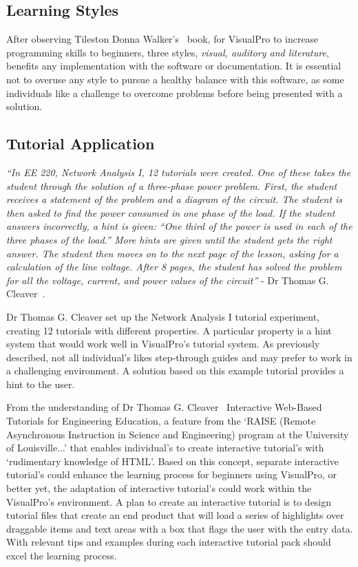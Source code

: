 \documentclass[12pt]{report} %
\begin{document}
		\subsection{Learning Styles}
		After observing Tileston Donna Walker's~\cite{tileston_donna_walker_10_2011} book, for VisualPro to increase programming skills to beginners, three styles, \textit{visual, auditory and literature}, benefits any implementation with the software or documentation. It is essential not to overuse any style to pursue a healthy balance with this software, as some individuals like a challenge to overcome problems before being presented with a solution. 

		\subsection{Tutorial Application}
		\begin{center}
			\textit{``In EE 220, Network Analysis I, 12 tutorials were created. One of these takes the student through the solution of a three-phase power problem. First, the student receives a statement of the problem and a diagram of the circuit. The student is then asked to find the power consumed in one phase of the load. If the student answers incorrectly, a hint is given: “One third of the power is used in each of the three phases of the load.” More hints are given until the student gets the right answer. The student then moves on to the next page of the lesson, asking for a calculation of the line voltage. After 8 pages, the student has solved the	problem for all the voltage, current, and power values of the circuit''} - Dr Thomas G. Cleaver~\cite{cleaver_interactive_1999}.
		\end{center}

		Dr Thomas G. Cleaver set up the Network Analysis I tutorial experiment, creating 12 tutorials with different properties. A particular property is a hint system that would work well in VisualPro's tutorial system. As previously described, not all individual's likes step-through guides and may prefer to work in a challenging environment. A solution based on this example tutorial provides a hint to the user.
		
		From the understanding of Dr Thomas G. Cleaver~\cite{cleaver_interactive_1999} Interactive Web-Based Tutorials for Engineering Education, a feature from the `RAISE (Remote Asynchronous Instruction in Science and Engineering) program at the University of Louisville...' that enables individual's to create interactive tutorial's with `rudimentary knowledge of HTML'. Based on this concept, separate interactive tutorial's could enhance the learning process for beginners using VisualPro, or better yet, the adaptation of interactive tutorial's could work within the VisualPro's environment. A plan to create an interactive tutorial is to design tutorial files that create an end product that will load a series of highlights over draggable items and text areas with a box that flags the user with the entry data. With relevant tips and examples during each interactive tutorial pack should excel the learning process.
\end{document}
